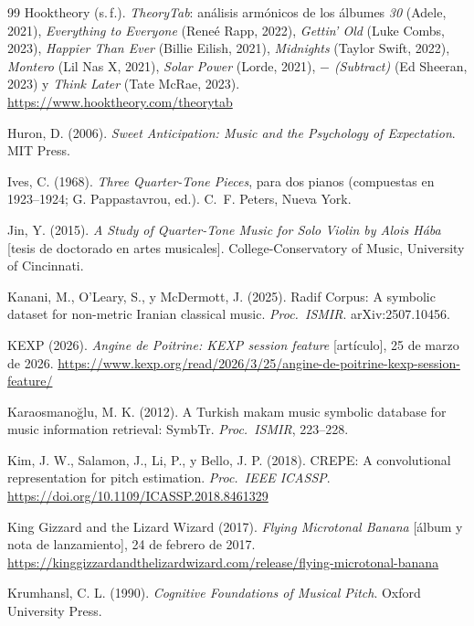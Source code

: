 \begin{thebibliography}{99}
Hooktheory (s.\,f.). \emph{TheoryTab}: análisis armónicos de los álbumes \emph{30} (Adele, 2021), \emph{Everything to
Everyone} (Reneé Rapp, 2022), \emph{Gettin' Old} (Luke Combs, 2023), \emph{Happier Than Ever} (Billie Eilish, 2021),
\emph{Midnights} (Taylor Swift, 2022), \emph{Montero} (Lil Nas X, 2021), \emph{Solar Power} (Lorde, 2021),
\emph{$-$ (Subtract)} (Ed Sheeran, 2023) y \emph{Think Later} (Tate McRae, 2023). \url{https://www.hooktheory.com/theorytab}

Huron, D. (2006). \emph{Sweet Anticipation: Music and the Psychology of Expectation}. MIT Press.

Ives, C. (1968). \emph{Three Quarter-Tone Pieces}, para dos pianos (compuestas en 1923--1924; G. Pappastavrou, ed.).
C.\ F. Peters, Nueva York.

Jin, Y. (2015). \emph{A Study of Quarter-Tone Music for Solo Violin by Alois Hába} [tesis de doctorado en artes
musicales]. College-Conservatory of Music, University of Cincinnati.

Kanani, M., O'Leary, S., y McDermott, J. (2025). Radif Corpus: A symbolic dataset for non-metric Iranian classical
music. \emph{Proc.\ ISMIR}. arXiv:2507.10456.

KEXP (2026). \emph{Angine de Poitrine: KEXP session feature} [artículo], 25 de marzo de 2026.
\url{https://www.kexp.org/read/2026/3/25/angine-de-poitrine-kexp-session-feature/}

Karaosmanoğlu, M. K. (2012). A Turkish makam music symbolic database for music information retrieval: SymbTr.
\emph{Proc.\ ISMIR}, 223--228.

Kim, J. W., Salamon, J., Li, P., y Bello, J. P. (2018). CREPE: A convolutional representation for pitch estimation.
\emph{Proc.\ IEEE ICASSP}. \url{https://doi.org/10.1109/ICASSP.2018.8461329}

King Gizzard and the Lizard Wizard (2017). \emph{Flying Microtonal Banana} [álbum y nota de lanzamiento], 24 de febrero
de 2017. \url{https://kinggizzardandthelizardwizard.com/release/flying-microtonal-banana}

Krumhansl, C. L. (1990). \emph{Cognitive Foundations of Musical Pitch}. Oxford University Press.


\end{thebibliography}
